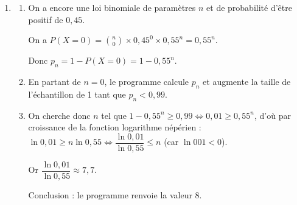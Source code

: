 \begin{enumerate}
\begin{enumerate}
La variable $X$ suit donc une loi binomiale de paramètres $n = 20$ et de probabilité $p = 0,45$ trouvé à la question \textbf{1. c.}.
		\item 
On a $p\left(X = 5\right) = \binom{20}{5} \times 0,45^5 \times (1 - 0,45)^{20-5} = \np{15504}\times 0,45^5  \times 0,55^{15} \approx \np{0,0365}$ soit environ 0,037.

		\item 
La calculatrice donne $P(X < 9) \approx 0,414$.
		\item 
On sait que l'espérance $E = n \times p = 20 \times 0,45 = 9$.
		
Cela signifie que sur un grand nombre d'échantillons il y aura en moyenne 9 chats positifs par échantillon de 20.
	\end{enumerate}		
\item 
	\begin{enumerate}
		\item 
On a encore une loi binomiale de paramètres $n$ et de probabilité d'être positif de $0,45$.

On a $P(X = 0) = \binom{n}{0}\times 0,45^0 \times 0,55^n = 0,55^n$.

Donc $p_n = 1 - P(X = 0) =  1 - 0,55^n$.
		\item












En partant de $n=0$, le programme calcule $p_n$ et augmente la taille de l'échantillon de 1 tant que $p_n < 0,99$.

		\item 
		On cherche donc $n$ tel que $1 - 0,55^n \geqslant 0,99 \iff 0,01 \geqslant 0,55^n$, d'où par croissance de la fonction logarithme népérien : $\ln 0,01 \geqslant n \ln 0,55 \iff \dfrac{\ln 0,01}{\ln 0,55} \leqslant n$ (car $\ln 001 < 0$).
		
		Or $\dfrac{\ln 0,01}{\ln 0,55} \approx 7,7$.
		
Conclusion : le programme renvoie la valeur 8.
	\end{enumerate}
\end{enumerate}

\bigskip
